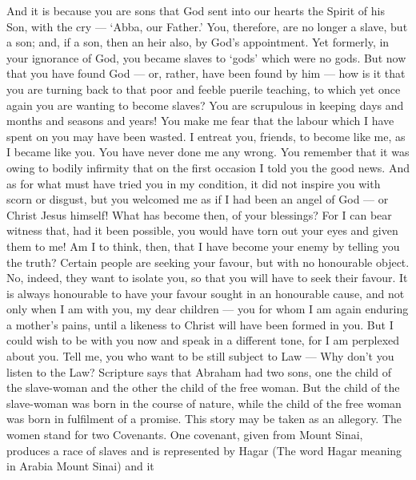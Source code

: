  And it is because you are sons that God sent into our
hearts the Spirit of his Son, with the cry --- `Abba, our Father.'
 You, therefore, are no longer a slave, but a son; and, if a
son, then an heir also, by God's appointment.  Yet formerly,
in your ignorance of God, you became slaves to `gods' which were no
gods.  But now that you have found God --- or, rather, have
been found by him --- how is it that you are turning back to that poor
and feeble puerile teaching, to which yet once again you are wanting to
become slaves?  You are scrupulous in keeping days and
months and seasons and years!  You make me fear that the
labour which I have spent on you may have been wasted.  I
entreat you, friends, to become like me, as I became like you. You have
never done me any wrong.  You remember that it was owing to
bodily infirmity that on the first occasion I told you the good news.
 And as for what must have tried you in my condition, it
did not inspire you with scorn or disgust, but you welcomed me as if I
had been an angel of God --- or Christ Jesus himself!  What
has become then, of your blessings? For I can bear witness that, had it
been possible, you would have torn out your eyes and given them to me!
 Am I to think, then, that I have become your enemy by
telling you the truth?  Certain people are seeking your
favour, but with no honourable object. No, indeed, they want to isolate
you, so that you will have to seek their favour.  It is
always honourable to have your favour sought in an honourable cause, and
not only when I am with you, my dear children ---  you for
whom I am again enduring a mother's pains, until a likeness to Christ
will have been formed in you.  But I could wish to be with
you now and speak in a different tone, for I am perplexed about you.
 Tell me, you who want to be still subject to Law --- Why
don't you listen to the Law?  Scripture says that Abraham
had two sons, one the child of the slave-woman and the other the child
of the free woman.  But the child of the slave-woman was
born in the course of nature, while the child of the free woman was born
in fulfilment of a promise.  This story may be taken as an
allegory. The women stand for two Covenants. One covenant, given from
Mount Sinai, produces a race of slaves and is represented by Hagar
 (The word Hagar meaning in Arabia Mount Sinai) and it
